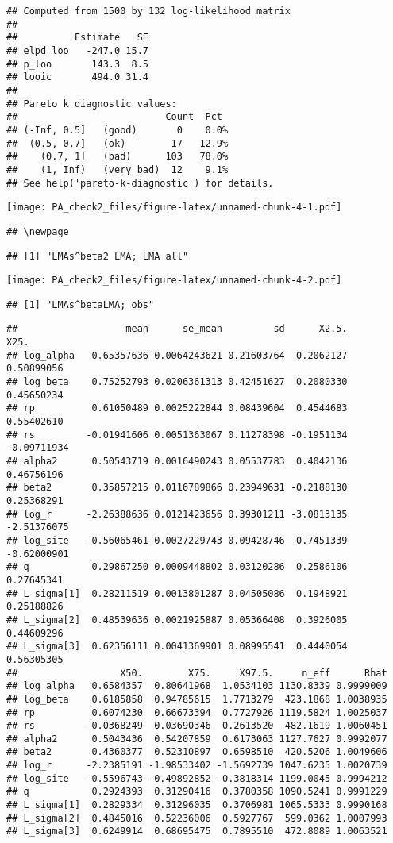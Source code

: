 \documentclass[12pt,]{article}
\begin{document}
\begin{verbatim}
## Computed from 1500 by 132 log-likelihood matrix
## 
##          Estimate   SE
## elpd_loo   -247.0 15.7
## p_loo       143.3  8.5
## looic       494.0 31.4
## 
## Pareto k diagnostic values:
##                          Count  Pct 
## (-Inf, 0.5]   (good)       0    0.0%
##  (0.5, 0.7]   (ok)        17   12.9%
##    (0.7, 1]   (bad)      103   78.0%
##    (1, Inf)   (very bad)  12    9.1%
## See help('pareto-k-diagnostic') for details.
\end{verbatim}

\texttt{[image: PA\_check2\_files/figure-latex/unnamed-chunk-4-1.pdf]}

\begin{verbatim}
## \newpage
\end{verbatim}

\begin{verbatim}
## [1] "LMAs^beta2 LMA; LMA all"
\end{verbatim}

\texttt{[image: PA\_check2\_files/figure-latex/unnamed-chunk-4-2.pdf]}

\begin{verbatim}
## [1] "LMAs^betaLMA; obs"
\end{verbatim}

\begin{verbatim}
##                   mean      se_mean         sd      X2.5.        X25.
## log_alpha   0.65357636 0.0064243621 0.21603764  0.2062127  0.50899056
## log_beta    0.75252793 0.0206361313 0.42451627  0.2080330  0.45650234
## rp          0.61050489 0.0025222844 0.08439604  0.4544683  0.55402610
## rs         -0.01941606 0.0051363067 0.11278398 -0.1951134 -0.09711934
## alpha2      0.50543719 0.0016490243 0.05537783  0.4042136  0.46756196
## beta2       0.35857215 0.0116789866 0.23949631 -0.2188130  0.25368291
## log_r      -2.26388636 0.0121423656 0.39301211 -3.0813135 -2.51376075
## log_site   -0.56065461 0.0027229743 0.09428746 -0.7451339 -0.62000901
## q           0.29867250 0.0009448802 0.03120286  0.2586106  0.27645341
## L_sigma[1]  0.28211519 0.0013801287 0.04505086  0.1948921  0.25188826
## L_sigma[2]  0.48539636 0.0021925887 0.05366408  0.3926005  0.44609296
## L_sigma[3]  0.62356111 0.0041369901 0.08995541  0.4440054  0.56305305
##                  X50.        X75.     X97.5.     n_eff      Rhat
## log_alpha   0.6584357  0.80641968  1.0534103 1130.8339 0.9999009
## log_beta    0.6185858  0.94785615  1.7713279  423.1868 1.0038935
## rp          0.6074230  0.66673394  0.7727926 1119.5824 1.0025037
## rs         -0.0368249  0.03690346  0.2613520  482.1619 1.0060451
## alpha2      0.5043436  0.54207859  0.6173063 1127.7627 0.9992077
## beta2       0.4360377  0.52310897  0.6598510  420.5206 1.0049606
## log_r      -2.2385191 -1.98533402 -1.5692739 1047.6235 1.0020739
## log_site   -0.5596743 -0.49892852 -0.3818314 1199.0045 0.9994212
## q           0.2924393  0.31290416  0.3780358 1090.5241 0.9991229
## L_sigma[1]  0.2829334  0.31296035  0.3706981 1065.5333 0.9990168
## L_sigma[2]  0.4845016  0.52236006  0.5927767  599.0362 1.0007993
## L_sigma[3]  0.6249914  0.68695475  0.7895510  472.8089 1.0063521
\end{verbatim}
\end{document}
